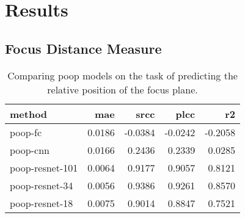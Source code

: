 \chapter{Results}
\label{ch:Results}


\section{Focus Distance Measure}
\label{sec:Results:FocusDistance}


\begin{table}
    \centering
    \caption{Comparing \acs{poop} models on the task of predicting the relative position of the focus plane.}
    \begin{tabular}{|l|rrrr|}
        \hline
        method          & \acs{mae} & \acs{srcc} & \acs{plcc} & \acs{r2} \\
        \hline
        \acs{poop}-\acs{fc}        & 0.0186 & -0.0384 & -0.0242 & -0.2058 \\
        \acs{poop}-\acs{cnn}        & 0.0166 &  0.2436 &  0.2339 &  0.0285 \\
        \acs{poop}-\acs{resnet}-101      & 0.0064 &  0.9177 &  0.9057 &  0.8121 \\
        \acs{poop}-\acs{resnet}-34       & 0.0056 &  0.9386 &  0.9261 &  0.8570 \\
        \acs{poop}-\acs{resnet}-18       & 0.0075 &  0.9014 &  0.8847 &  0.7521 \\
        \hline
    \end{tabular}
    \label{tab:Results:Models:Accuracy}
\end{table}

